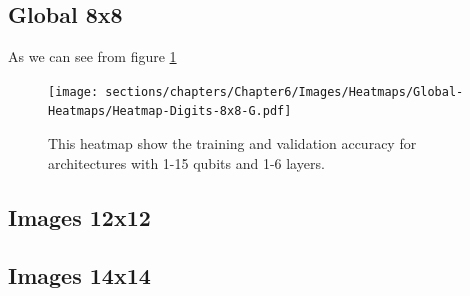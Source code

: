 \subsection{Global 8x8}

As we can see from figure \ref{fig:heatmap-8x8-G}

\begin{figure}[h]
    \texttt{[image: sections/chapters/Chapter6/Images/Heatmaps/Global-Heatmaps/Heatmap-Digits-8x8-G.pdf]}
    \caption{This heatmap show the training and validation accuracy for architectures with 1-15 qubits and
    1-6 layers.}
    \label{fig:heatmap-8x8-G}
\end{figure}





\subsection{Images 12x12}


\subsection{Images 14x14}


